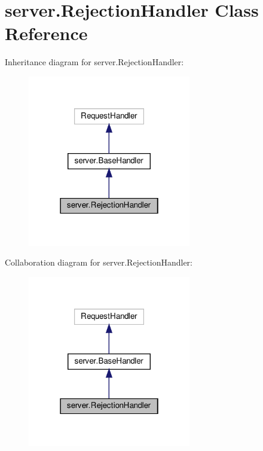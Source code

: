 \hypertarget{classserver_1_1RejectionHandler}{}\section{server.\+Rejection\+Handler Class Reference}
\label{classserver_1_1RejectionHandler}


Inheritance diagram for server.\+Rejection\+Handler\+:
\nopagebreak
\begin{figure}[H]
\begin{center}
\leavevmode
\includegraphics[width=202pt]{classserver_1_1RejectionHandler__inherit__graph}
\end{center}
\end{figure}


Collaboration diagram for server.\+Rejection\+Handler\+:
\nopagebreak
\begin{figure}[H]
\begin{center}
\leavevmode
\includegraphics[width=202pt]{classserver_1_1RejectionHandler__coll__graph}
\end{center}
\end{figure}
